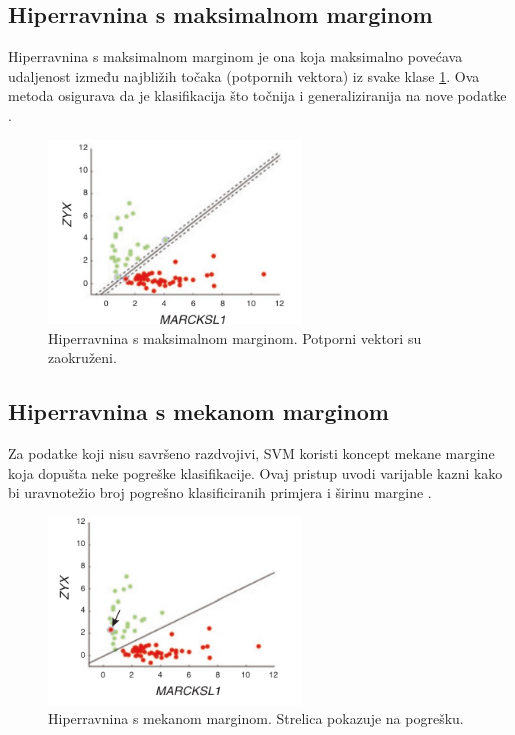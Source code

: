 \documentclass[zavrsnirad]{fer}
\begin{document}
\subsection{Hiperravnina s maksimalnom marginom}
Hiperravnina s maksimalnom marginom je ona koja maksimalno povećava udaljenost između najbližih točaka (potpornih vektora) iz svake klase \ref{fig:maks_marg}. Ova metoda osigurava da je klasifikacija što točnija i generaliziranija na nove podatke \cite{Noble2006}.
\begin{figure}[h]
	\centering
	\includegraphics[width=0.6\textwidth]{Figures/maks_margina.png}
	\caption{Hiperravnina s maksimalnom marginom. Potporni vektori su zaokruženi. \cite{Noble2006}}
	\label{fig:maks_marg}
\end{figure}

\subsection{Hiperravnina s mekanom marginom}
Za podatke koji nisu savršeno razdvojivi, SVM koristi koncept mekane margine koja dopušta neke pogreške klasifikacije. Ovaj pristup uvodi varijable kazni kako bi uravnotežio broj pogrešno klasificiranih primjera i širinu margine \cite{fletcher2009}.
\begin{figure}[h]
	\centering
	\includegraphics[width=0.6\textwidth]{Figures/soft_margin.png}
	\caption{Hiperravnina s mekanom marginom. Strelica pokazuje na pogrešku. \cite{Noble2006}}
	\label{fig:soft_margin}
\end{figure}
\end{document}
